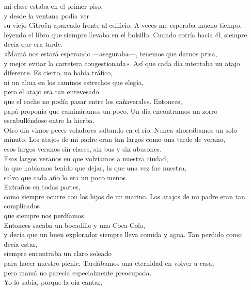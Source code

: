 \begin{versopropio}
mi clase estaba en el primer piso,\\
y desde la ventana podía ver\\
su viejo Citroën aparcado frente al edificio.
\stanzabreak
A veces me esperaba mucho tiempo,\\
leyendo el libro que siempre llevaba en el bolsillo.
\stanzabreak
Cuando corría hacia él, siempre decía que era tarde.\\
«Mamá nos estará esperando ---aseguraba---, tenemos que darnos prisa,\\
y mejor evitar la carretera congestionada».
\stanzabreak
Así que cada día intentaba un atajo diferente.
\stanzabreak
Es cierto, no había tráfico,\\
ni un alma en los caminos estrechos que elegía,\\
pero el atajo era tan enrevesado\\
que el coche no podía pasar entre los cañaverales. Entonces,\\
papá proponía que camináramos un poco.
\stanzabreak
Un día encontramos un zorro escabulléndose entre la hierba.\\
Otro día vimos peces voladores saltando en el río.
\stanzabreak
Nunca ahorrábamos un solo minuto.
\stanzabreak
Los atajos de mi padre eran tan largos como una tarde de verano,\\
esos largos veranos sin clases, sin bus y sin abusones.\\
Esos largos veranos en que volvíamos a nuestra ciudad,\\
la que habíamos tenido que dejar, la que una vez fue nuestra,\\
salvo que cada año lo era un poco menos.\\
Extraños en todas partes,\\
como siempre ocurre con los hijos de un marino.
\stanzabreak
Los atajos de mi padre eran tan complicados\\
que siempre nos perdíamos.\\
Entonces sacaba un bocadillo y una Coca-Cola,\\
y decía que un buen explorador siempre lleva comida y agua.
\stanzabreak
Tan perdido como decía estar,\\
siempre encontraba un claro soleado\\
para hacer nuestro picnic.
\stanzabreak
Tardábamos una eternidad en volver a casa,\\
pero mamá no parecía especialmente preocupada.\\
Yo lo sabía, porque la oía cantar,\\

\end{versopropio}
